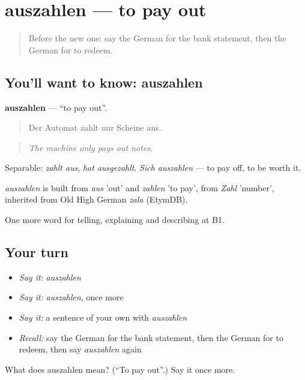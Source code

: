 \section[auszahlen]{auszahlen — to pay out}

\label{lesson:GE-C450-auszahlen}



\begin{quote}
Before the new one: say the German for the bank statement, then the German for to redeem.
\end{quote}

\subsection*{You'll want to know: auszahlen}
\textbf{auszahlen} — \textquotedblleft{}to pay out\textquotedblright{}.

\begin{quote}
Der Automat zahlt nur Scheine aus.
\end{quote}

\begin{quote}
\emph{The machine only pays out notes.}
\end{quote}

Separable: \emph{zahlt aus}, \emph{hat ausgezahlt}. \emph{Sich auszahlen} — to pay off, to be worth it.

\begin{cousinweb}
\emph{auszahlen} is built from \emph{aus} 'out' and \emph{zahlen} 'to pay', from \emph{Zahl} 'number', inherited from Old High German \emph{zala} (EtymDB).
\end{cousinweb}

\begin{grammarlens}[title={What you've built}]
One more word for telling, explaining and describing at B1.
\end{grammarlens}

\subsection*{Your turn}
\begin{itemize}
\raggedright
  \item \emph{Say it:} \emph{auszahlen}
  \item \emph{Say it:} \emph{auszahlen}, once more
  \item \emph{Say it:} a sentence of your own with \emph{auszahlen}
  \item \emph{Recall:} say the German for the bank statement, then the German for to redeem, then say \emph{auszahlen} again
\end{itemize}

\begin{tcolorbox}[breakable,colback=teal!4,colframe=teal!35!black,title={Before you move on}]
What does auszahlen mean? (\textquotedblleft{}To pay out\textquotedblright{}.) Say it once more.
\end{tcolorbox}
